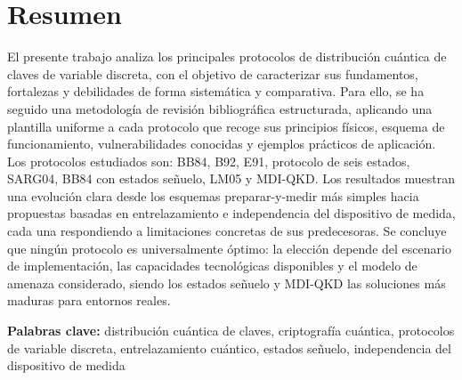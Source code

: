 \chapter{Resumen}

El presente trabajo analiza los principales protocolos de distribución cuántica de claves de variable discreta, con el objetivo de caracterizar sus fundamentos, fortalezas y debilidades de forma sistemática y comparativa. Para ello, se ha seguido una metodología de revisión bibliográfica estructurada, aplicando una plantilla uniforme a cada protocolo que recoge sus principios físicos, esquema de funcionamiento, vulnerabilidades conocidas y ejemplos prácticos de aplicación. Los protocolos estudiados son: BB84, B92, E91, protocolo de seis estados, SARG04, BB84 con estados señuelo, LM05 y MDI-QKD. Los resultados muestran una evolución clara desde los esquemas preparar-y-medir más simples hacia propuestas basadas en entrelazamiento e independencia del dispositivo de medida, cada una respondiendo a limitaciones concretas de sus predecesoras. Se concluye que ningún protocolo es universalmente óptimo: la elección depende del escenario de implementación, las capacidades tecnológicas disponibles y el modelo de amenaza considerado, siendo los estados señuelo y MDI-QKD las soluciones más maduras para entornos reales.

\vspace{0.5cm}
{\bf Palabras clave:}  distribución cuántica de claves, criptografía cuántica, protocolos de variable discreta, entrelazamiento cuántico, estados señuelo, independencia del dispositivo de medida